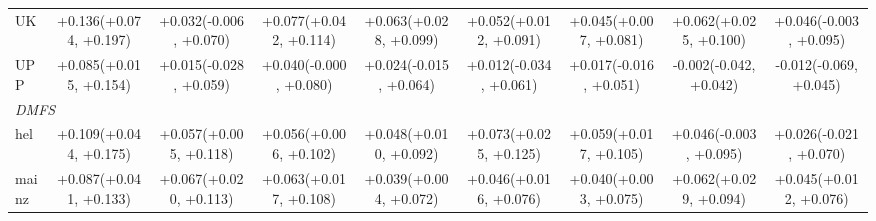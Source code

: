 \begin{table}[t]
\begin{tabular}{lcccccccc}
UK & +0.136\newline(+0.074, +0.197) & +0.032\newline(-0.006, +0.070) & +0.077\newline(+0.042, +0.114) & +0.063\newline(+0.028, +0.099) & +0.052\newline(+0.012, +0.091) & +0.045\newline(+0.007, +0.081) & +0.062\newline(+0.025, +0.100) & +0.046\newline(-0.003, +0.095) \\
UPP & +0.085\newline(+0.015, +0.154) & +0.015\newline(-0.028, +0.059) & +0.040\newline(-0.000, +0.080) & +0.024\newline(-0.015, +0.064) & +0.012\newline(-0.034, +0.061) & +0.017\newline(-0.016, +0.051) & -0.002\newline(-0.042, +0.042) & -0.012\newline(-0.069, +0.045) \\
\midrule
\multicolumn{9}{l}{\textit{DMFS}} \\
hel & +0.109\newline(+0.044, +0.175) & +0.057\newline(+0.005, +0.118) & +0.056\newline(+0.006, +0.102) & +0.048\newline(+0.010, +0.092) & +0.073\newline(+0.025, +0.125) & +0.059\newline(+0.017, +0.105) & +0.046\newline(-0.003, +0.095) & +0.026\newline(-0.021, +0.070) \\
mainz & +0.087\newline(+0.041, +0.133) & +0.067\newline(+0.020, +0.113) & +0.063\newline(+0.017, +0.108) & +0.039\newline(+0.004, +0.072) & +0.046\newline(+0.016, +0.076) & +0.040\newline(+0.003, +0.075) & +0.062\newline(+0.029, +0.094) & +0.045\newline(+0.012, +0.076) \\

\end{tabular}
\end{table}
